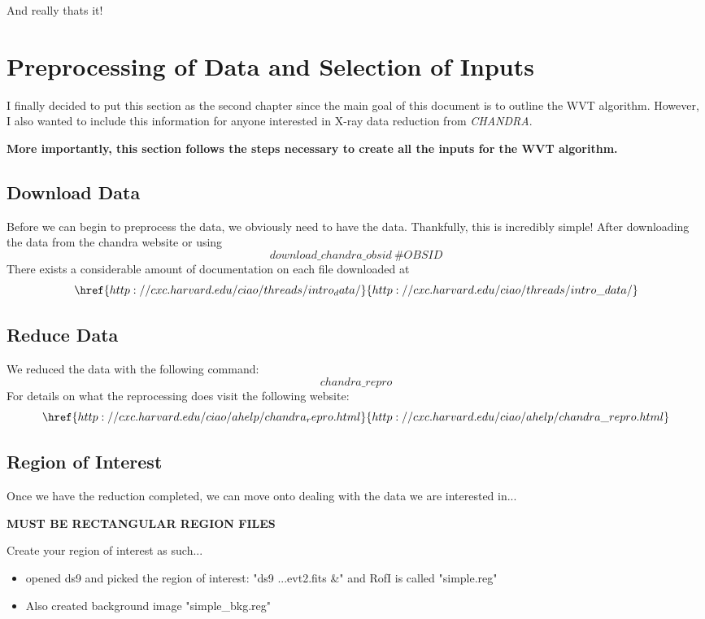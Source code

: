 \documentclass[11pt,letterpaper]{article}
\begin{document}
And really thats it!

\newpage


\section{Preprocessing of Data and Selection of Inputs}
I finally decided to put this section as the second chapter since the main goal of this document is to outline the WVT algorithm. However, I also wanted to include this information for anyone interested in X-ray data reduction from \textit{CHANDRA}.

\textbf{More importantly, this section follows the steps necessary to create all the inputs for the WVT algorithm.}

\subsection{Download Data}
Before we can begin to preprocess the data, we obviously need to have the data. Thankfully, this is incredibly simple! After downloading the data from the chandra website or using $$download\_chandra\_obsid \ \#OBSID $$ 
There exists a considerable amount of documentation on each file downloaded at 
$$\href{http://cxc.harvard.edu/ciao/threads/intro_data/}{http://cxc.harvard.edu/ciao/threads/intro\_data/} $$
\subsection{Reduce Data}
We reduced the data with the following command: $$chandra\_repro $$
For details on what the reprocessing does visit the following website:
$$\href{http://cxc.harvard.edu/ciao/ahelp/chandra_repro.html}{http://cxc.harvard.edu/ciao/ahelp/chandra\_repro.html}$$



\subsection{Region of Interest}
Once we have the reduction completed, we can move onto dealing with the data we are interested in...

\textbf{MUST BE RECTANGULAR REGION FILES}

Create your region of interest as such...
\begin{itemize}
	\item opened ds9 and picked the region of interest: "ds9 ...evt2.fits \&" and RofI is called "simple.reg"
	\item Also created background image "simple\_bkg.reg"
\end{itemize}
\end{document}

